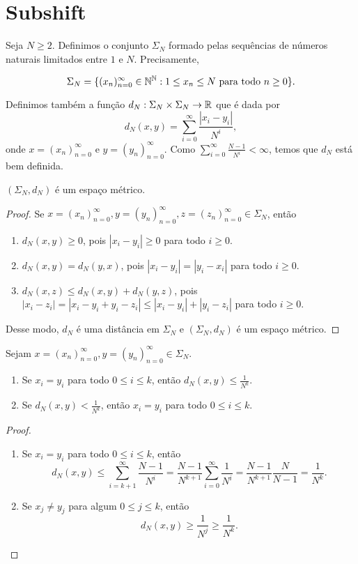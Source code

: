 \section{Subshift}

Seja $N \geq 2$. Definimos o conjunto $\Sigma_N$ formado pelas sequências de números naturais limitados entre $1$ e $N$. Precisamente,

$$\Sigma_N = \{ (x_n)_{n=0}^{\infty} \in \mathbb{N}^{\mathbb{N}} : 1 \leq x_n \leq N  \textrm{ para todo } n \geq 0 \}.$$

Definimos também a função $d_N : \Sigma_N \times \Sigma_N \to \mathbb{R}$ que é dada por
$$d_N(x, y) = \sum_{i=0}^\infty \frac{|x_i - y_i|}{N^i},$$
onde $x = (x_n)_{n=0}^{\infty}$ e $y = (y_n)_{n=0}^{\infty}$. Como $\sum_{i=0}^\infty \frac{N-1}{N^i} < \infty$, temos que $d_N$ está bem definida.


\begin{proposition}
$(\Sigma_N, d_N)$ é um espaço métrico.
\end{proposition}


\begin{proof}
Se $x = (x_n)_{n=0}^{\infty}, y = (y_n)_{n=0}^{\infty}, z = (z_n)_{n=0}^{\infty} \in \Sigma_N$, então
\begin{enumerate}
\item $d_N(x, y) \geq 0$, pois $|x_i - y_i| \geq 0$ para todo $i \geq 0$.
\item $d_N(x, y) = d_N(y, x)$, pois $|x_i - y_i| = |y_i - x_i|$ para todo $i \geq 0$.
\item $d_N(x, z) \leq d_N(x, y) + d_N(y, z)$, pois $|x_i - z_i| = |x_i - y_i + y_i - z_i| \leq |x_i - y_i| + |y_i - z_i|$ para todo $i \geq 0$.
\end{enumerate}
Desse modo, $d_N$ é uma distância em $\Sigma_N$ e $(\Sigma_N, d_N)$ é um espaço métrico.
\end{proof}


\begin{proposition}
Sejam $x = (x_n)_{n=0}^{\infty}, y = (y_n)_{n=0}^{\infty} \in \Sigma_N$.
\begin{enumerate}
\item Se $x_i = y_i$ para todo $0 \leq i \leq k$, então $d_N(x, y) \leq \frac{1}{N^k}$.
\item Se $d_N(x, y) < \frac{1}{N^k}$, então $x_i = y_i$ para todo $0 \leq i \leq k$.
\end{enumerate}
\end{proposition}


\begin{proof}
\begin{enumerate}
\item Se $x_i = y_i$ para todo $0 \leq i \leq k$, então
$$d_N(x, y) \leq \sum_{i=k+1}^\infty \frac{N-1}{N^i} = \frac{N-1}{N^{k+1}}\sum_{i=0}^\infty \frac{1}{N^{i}} = \frac{N-1}{N^{k+1}} \frac{N}{N - 1} = \frac{1}{N^k}.$$

\item Se $x_j \neq y_j$ para algum $0 \leq j \leq k$, então
$$d_N(x, y) \geq \frac{1}{N^j} \geq \frac{1}{N^k}.$$
\end{enumerate}
\end{proof}

